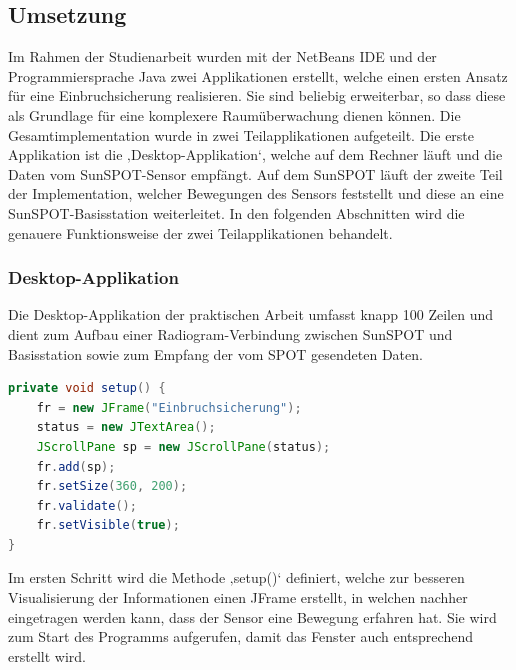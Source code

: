 \subsection{Umsetzung}\label{s:Umsetzung}

Im Rahmen der Studienarbeit wurden mit der NetBeans IDE und der Programmiersprache Java zwei Applikationen erstellt, welche einen ersten Ansatz für eine Einbruchsicherung realisieren. Sie sind beliebig erweiterbar, so dass diese als Grundlage für eine komplexere Raumüberwachung dienen können. Die Gesamtimplementation wurde in zwei Teilapplikationen aufgeteilt. Die erste Applikation ist die ‚Desktop-Applikation‘, welche auf dem Rechner läuft und die Daten vom SunSPOT-Sensor empfängt. Auf dem SunSPOT läuft der zweite Teil der Implementation, welcher Bewegungen des Sensors feststellt und diese an eine SunSPOT-Basisstation weiterleitet. In den folgenden Abschnitten wird die genauere Funktionsweise der zwei Teilapplikationen behandelt.

\subsubsection{Desktop-Applikation}\label{sss:Desktop-Applikation}

Die Desktop-Applikation der praktischen Arbeit umfasst knapp 100 Zeilen und dient zum Aufbau einer Radiogram-Verbindung zwischen SunSPOT und Basisstation sowie zum Empfang der vom SPOT gesendeten Daten. 

\begin{lstlisting}[language=Java,caption={Ausschnitt aus der setup()-Methode},label=lst:setup,frame=single] 
private void setup() {
	fr = new JFrame("Einbruchsicherung");
	status = new JTextArea();
	JScrollPane sp = new JScrollPane(status);
	fr.add(sp);
	fr.setSize(360, 200);
	fr.validate();
	fr.setVisible(true);
}           
\end{lstlisting}

Im ersten Schritt wird die Methode ‚setup()‘ definiert, welche zur besseren Visualisierung der Informationen einen JFrame erstellt, in welchen nachher eingetragen werden kann, dass der Sensor eine Bewegung erfahren hat. Sie wird zum Start des Programms aufgerufen, damit das Fenster auch entsprechend erstellt wird. \\

